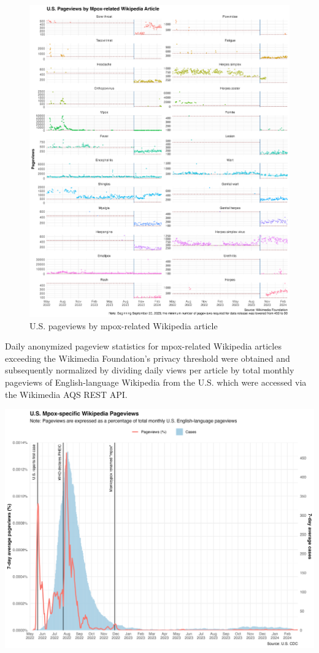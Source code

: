 \documentclass[
  12pt,
]{article}
\begin{document}
\begin{figure}[H]

{\centering \includegraphics{images/pageviews-mpox-related.png}

}

\caption{U.S. pageviews by mpox-related Wikipedia article}

\end{figure}%

Daily anonymized pageview statistics for mpox-related Wikipedia articles
exceeding the Wikimedia Foundation's privacy threshold were obtained and
subsequently normalized by dividing daily views per article by total
monthly pageviews of English-language Wikipedia from the U.S. which were
accessed via the Wikimedia AQS REST API.

\includegraphics{images/cases-&-pageviews-rolling-avg.png}\\
\end{document}
